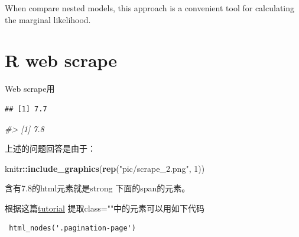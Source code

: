 \documentclass[
]{book}
\newenvironment{Shaded}{\begin{snugshade}}{\end{snugshade}}
\newcommand{\CommentTok}[1]{\textcolor[rgb]{0.56,0.35,0.01}{\textit{#1}}}
\newcommand{\DecValTok}[1]{\textcolor[rgb]{0.00,0.00,0.81}{#1}}
\newcommand{\KeywordTok}[1]{\textcolor[rgb]{0.13,0.29,0.53}{\textbf{#1}}}
\newcommand{\NormalTok}[1]{#1}
\newcommand{\OperatorTok}[1]{\textcolor[rgb]{0.81,0.36,0.00}{\textbf{#1}}}
\newcommand{\StringTok}[1]{\textcolor[rgb]{0.31,0.60,0.02}{#1}}
\theoremstyle{definition}
\theoremstyle{definition}
\theoremstyle{definition}
\theoremstyle{remark}
\begin{document}
When compare nested models, this approach is a convenient tool for calculating the marginal likelihood.

\hypertarget{r-web-scrape}{%
\chapter{R web scrape}\label{r-web-scrape}}

Web scrape用

\begin{Shaded}
\end{Shaded}

\begin{verbatim}
## [1] 7.7
\end{verbatim}

\begin{Shaded}
\begin{Highlighting}[]
\CommentTok{#> [1] 7.8}
\end{Highlighting}
\end{Shaded}

上述的问题回答是由于：

\begin{Shaded}
\begin{Highlighting}[]
\NormalTok{knitr}\OperatorTok{::}\KeywordTok{include_graphics}\NormalTok{(}\KeywordTok{rep}\NormalTok{(}\StringTok{"pic/scrape_2.png"}\NormalTok{, }\DecValTok{1}\NormalTok{))}
\end{Highlighting}
\end{Shaded}

含有7.8的html元素就是strong 下面的span的元素。

根据这篇\href{https://www.datacamp.com/community/tutorials/r-web-scraping-rvest}{tutorial}
提取class=""中的元素可以用如下代码

\begin{verbatim}
 html_nodes('.pagination-page')
\end{verbatim}
\end{document}
